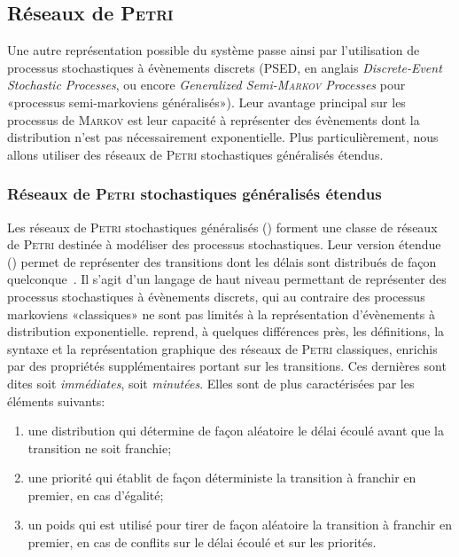    \subsection{Réseaux de \textsc{Petri}}

Une autre représentation possible du système passe ainsi par l'utilisation de processus stochastiques à évènements discrets (PSED, en anglais \textit{Discrete-Event Stochastic Processes}, ou encore \textit{Generalized Semi-\textsc{Markov} Processes} pour «processus semi-markoviens généralisés»).
Leur avantage principal sur les processus de \textsc{Markov} est leur capacité à représenter des évènements dont la distribution n'est pas nécessairement exponentielle.
Plus particulièrement, nous allons utiliser des réseaux de \textsc{Petri} stochastiques généralisés étendus.

        \subsubsection{Réseaux de \textsc{Petri} stochastiques généralisés étendus}
\label{sa:subsubsec:presRPSGe}
Les réseaux de \textsc{Petri} stochastiques généralisés (\rpsg) forment une classe de réseaux de \textsc{Petri} destinée à modéliser des processus stochastiques.
Leur version étendue (\rpsge) permet de représenter des transitions dont les délais sont distribués de façon quelconque~\cite{ABCDF95}.
Il s'agit d'un langage de haut niveau permettant de représenter des processus stochastiques à évènements discrets, qui au contraire des processus markoviens «classiques» ne sont pas limités à la représentation d'évènements à distribution exponentielle.
\rpsge reprend, à quelques différences près, les définitions, la syntaxe et la représentation graphique des réseaux de \textsc{Petri} classiques, enrichis par des propriétés supplémentaires portant sur les transitions.
Ces dernières sont dites soit \textit{immédiates}, soit \textit{minutées}.
Elles sont de plus caractérisées par les éléments suivants:
\begin{enumerate}
    \item une distribution qui détermine de façon aléatoire le délai écoulé avant que la transition ne soit franchie;
    \item une priorité qui établit de façon déterministe la transition à franchir en premier, en cas d'égalité;
    \item un poids qui est utilisé pour tirer de façon aléatoire la transition à franchir en premier, en cas de conflits sur le délai écoulé et sur les priorités.
\end{enumerate}


